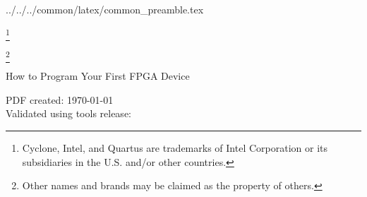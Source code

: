 %
%
%
%
%

\newcommand{\repoTopPath}{../../..}
\newcommand{\commonPreamblePath}{\repoTopPath/common/latex/common_preamble.tex}
 \commonPreamblePath


\sffamily

\begin{center}
\let\savethefootnote\thefootnote
\let\thefootnote\relax\footnote{Cyclone, Intel, and Quartus are trademarks of Intel Corporation or its subsidiaries in the U.S. and/or other countries.}
\addtocounter{footnote}{-1}
\let\thefootnote\savethefootnote
\hspace{-1em}
\let\savethefootnote\thefootnote
\let\thefootnote\relax\footnote{Other names and brands may be claimed as the property of others.}
\addtocounter{footnote}{-1}
\let\thefootnote\savethefootnote
\hspace{-1em}
\LARGE{How to Program Your First FPGA Device}\\[1em]
\end{center}

\begin{flushleft}
\normalsize{PDF created: \today}\\
\normalsize{Validated using tools release: \TheToolsReleaseVersion}
\end{flushleft}

